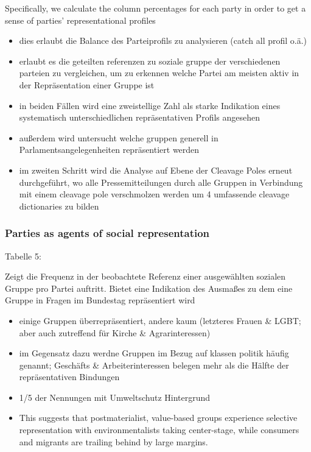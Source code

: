 \documentclass[11pt]{article}
\begin{document}
\begin{enumerate}
Specifically, we calculate the column percentages for each party in order to get a sense of parties’ representational profiles

\begin{itemize}
\item dies erlaubt die Balance des Parteiprofils zu analysieren (catch all profil o.ä.)
\item erlaubt es die geteilten referenzen zu soziale gruppe der verschiedenen parteien zu vergleichen, um zu erkennen welche Partei am meisten aktiv in der Repräsentation einer Gruppe ist
\item in beiden Fällen wird eine zweistellige Zahl als starke Indikation eines systematisch unterschiedlichen repräsentativen Profils angesehen
\item außerdem wird untersucht welche gruppen generell in Parlamentsangelegenheiten repräsentiert werden
\item im zweiten Schritt wird die Analyse auf Ebene der Cleavage Poles erneut durchgeführt, wo alle Pressemitteilungen durch alle Gruppen in Verbindung mit einem cleavage pole verschmolzen werden um 4 umfassende cleavage dictionaries zu bilden
\end{itemize}
\end{enumerate}

\subsubsection{Parties as agents of social representation}
\label{sec:org4ee5faf}

Tabelle 5: 

Zeigt die Frequenz in der beobachtete Referenz einer ausgewählten sozialen Gruppe pro Partei auftritt. Bietet eine Indikation des Ausmaßes zu dem eine Gruppe in Fragen im Bundestag repräsentiert wird 

\begin{itemize}
\item einige Gruppen überrepräsentiert, andere kaum (letzteres Frauen \& LGBT; aber auch zutreffend für Kirche \& Agrarinteressen)
\item im Gegensatz dazu werdne Gruppen im Bezug auf klassen politik häufig genannt; Geschäfts \& Arbeiterinteressen belegen mehr als die Hälfte der repräsentativen Bindungen
\item 1/5 der Nennungen mit Umweltschutz Hintergrund
\item This suggests that postmaterialist, value-based groups experience selective representation with environmentalists taking center-stage, while consumers and migrants are trailing behind by large margins.
\end{itemize}
\end{document}
